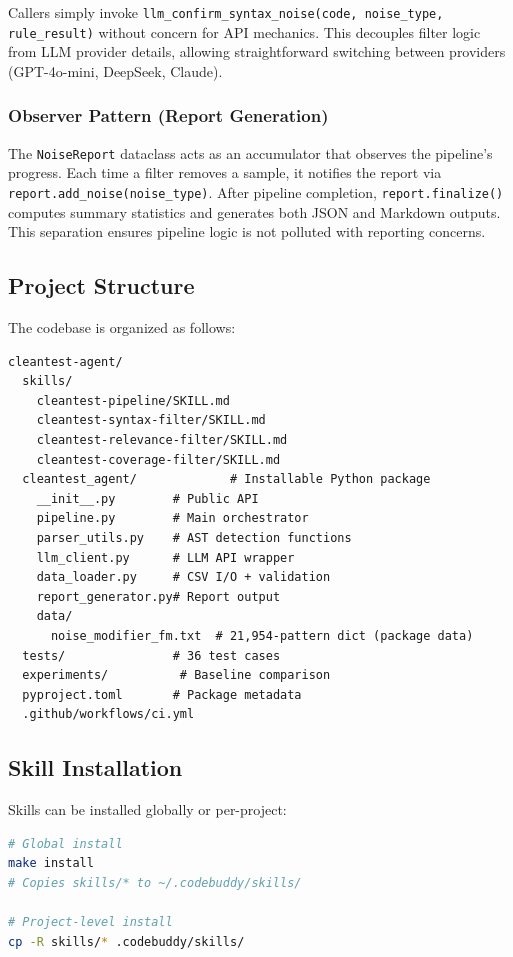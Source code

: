 \documentclass[acmlarge,nonacm,screen]{acmart}
\begin{document}
Callers simply invoke \texttt{llm\_confirm\_\allowbreak syntax\_\allowbreak noise(code, noise\_type, rule\_result)} without concern for API mechanics. This decouples filter logic from LLM provider details, allowing straightforward switching between providers (GPT-4o-mini, DeepSeek, Claude).

\subsubsection{Observer Pattern (Report Generation)}

The \texttt{NoiseReport} dataclass acts as an accumulator that observes the pipeline's progress. Each time a filter removes a sample, it notifies the report via \texttt{report.add\_noise(noise\_type)}. After pipeline completion, \texttt{report.finalize()} computes summary statistics and generates both JSON and Markdown outputs. This separation ensures pipeline logic is not polluted with reporting concerns.

\subsection{Project Structure}

The codebase is organized as follows:

\begin{lstlisting}[language={},caption={Repository structure}]
cleantest-agent/
  skills/
    cleantest-pipeline/SKILL.md
    cleantest-syntax-filter/SKILL.md
    cleantest-relevance-filter/SKILL.md
    cleantest-coverage-filter/SKILL.md
  cleantest_agent/             # Installable Python package
    __init__.py        # Public API
    pipeline.py        # Main orchestrator
    parser_utils.py    # AST detection functions
    llm_client.py      # LLM API wrapper
    data_loader.py     # CSV I/O + validation
    report_generator.py# Report output
    data/
      noise_modifier_fm.txt  # 21,954-pattern dict (package data)
  tests/               # 36 test cases
  experiments/          # Baseline comparison
  pyproject.toml       # Package metadata
  .github/workflows/ci.yml
\end{lstlisting}

\subsection{Skill Installation}

Skills can be installed globally or per-project:

\begin{lstlisting}[language=bash,caption={Installing skills to CodeBuddy}]
# Global install
make install
# Copies skills/* to ~/.codebuddy/skills/

# Project-level install
cp -R skills/* .codebuddy/skills/
\end{lstlisting}
\end{document}
